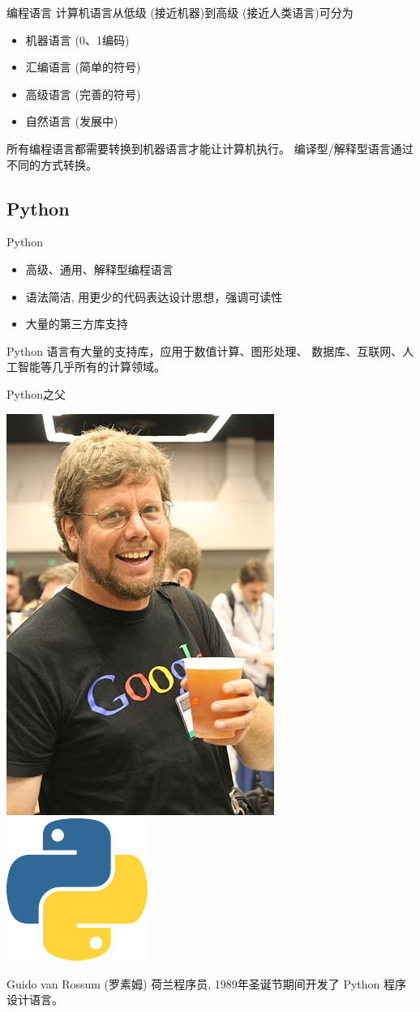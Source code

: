 \documentclass[14pt,t]{beamer}
\begin{document}
\begin{frame}{编程语言}
    计算机语言从低级 (接近机器)到高级 (接近人类语言)可分为
\begin{itemize}
    \item 机器语言 (0、1编码)
    \item 汇编语言 (简单的符号)
    \item 高级语言 (完善的符号)
    \item 自然语言 (发展中)
\end{itemize}
所有编程语言都需要转换到机器语言才能让计算机执行。
编译型/解释型语言通过不同的方式转换。
\end{frame}

\subsection{Python}
\begin{frame}{Python}
\begin{itemize}
    \item 高级、通用、解释型编程语言
    \item 语法简洁, 用更少的代码表达设计思想，强调可读性
    \item 大量的第三方库支持
\end{itemize}
    Python 语言有大量的支持库，应用于数值计算、图形处理、
    数据库、互联网、人工智能等几乎所有的计算领域。
\end{frame}

\begin{frame}{Python之父}
\begin{center}
\includegraphics[width=.16\textwidth]{Guido.jpg}
    \hspace{2cm}
\includegraphics[width=.2\textwidth]{python.pdf}
\end{center}

    Guido van Rossum (罗素姆) 荷兰程序员, 1989年圣诞节期间开发了
    Python 程序设计语言。
\end{frame}
\end{document}
